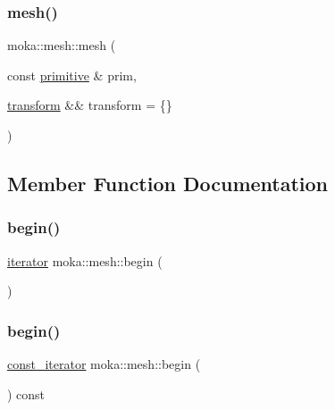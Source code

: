 \mbox{\label{classmoka_1_1mesh_aa25225d3f0f48dad9367890e59fc5abb}} 
\subsubsection{\texorpdfstring{mesh()}{mesh()}\hspace{0.1cm}{\footnotesize\ttfamily [2/2]}}
{\footnotesize\ttfamily moka\+::mesh\+::mesh (\begin{DoxyParamCaption}\item[{const \mbox{\hyperlink{classmoka_1_1primitive}{primitive}} \&}]{prim,  }\item[{\mbox{\hyperlink{classmoka_1_1transform}{transform}} \&\&}]{transform = {\ttfamily \{\}} }\end{DoxyParamCaption})\hspace{0.3cm}{\ttfamily [explicit]}}



\subsection{Member Function Documentation}
\mbox{\label{classmoka_1_1mesh_a603006cd6a0e1fdf3ea52f7e5e4b1a94}} 
\subsubsection{\texorpdfstring{begin()}{begin()}\hspace{0.1cm}{\footnotesize\ttfamily [1/2]}}
{\footnotesize\ttfamily \mbox{\hyperlink{classmoka_1_1mesh_a89827e48d6ebf6481c9a923042324756}{iterator}} moka\+::mesh\+::begin (\begin{DoxyParamCaption}{ }\end{DoxyParamCaption})}

\mbox{\label{classmoka_1_1mesh_a7be30acdc08f2cae714a95e18e94babb}} 
\subsubsection{\texorpdfstring{begin()}{begin()}\hspace{0.1cm}{\footnotesize\ttfamily [2/2]}}
{\footnotesize\ttfamily \mbox{\hyperlink{classmoka_1_1mesh_aea68be7cc8e79b9825775f199562bf90}{const\+\_\+iterator}} moka\+::mesh\+::begin (\begin{DoxyParamCaption}{ }\end{DoxyParamCaption}) const}

